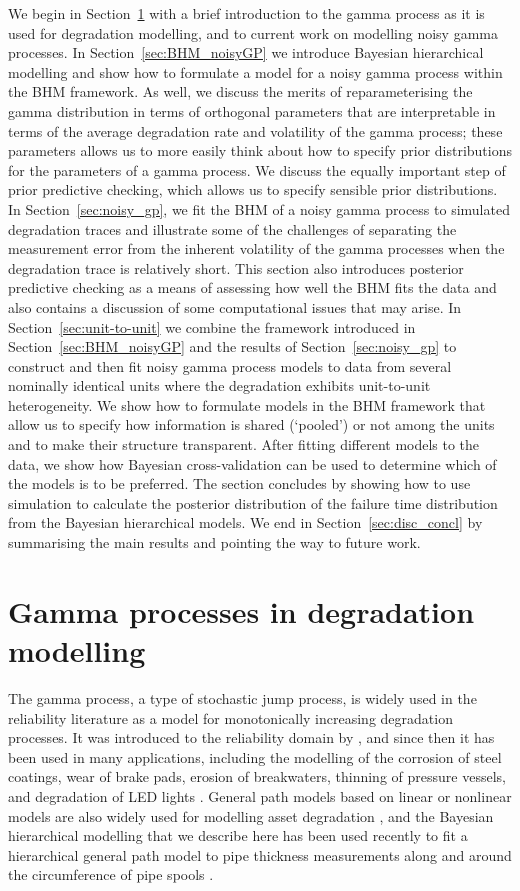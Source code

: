\documentclass{article}
\begin{document}
We begin in Section~\ref{sec:GP} with a brief introduction to the gamma process as it is used for degradation modelling, and to current work on modelling noisy gamma processes. In Section~\ref{sec:BHM_noisyGP} we introduce Bayesian hierarchical modelling and show how to formulate a model for a noisy gamma process within the BHM framework. As well, we discuss the merits of reparameterising the gamma distribution in terms of orthogonal parameters that are interpretable in terms of the average degradation rate and volatility of the gamma process; these parameters allows us to more easily think about how to specify prior distributions for the parameters of a gamma process. We  discuss the equally important step of prior predictive checking, which allows us to specify sensible prior distributions. In Section~\ref{sec:noisy_gp}, we fit the BHM of a noisy gamma process to simulated degradation traces and illustrate some of the challenges of separating the measurement error from the inherent volatility of the gamma processes when the degradation trace is relatively short. This section also introduces posterior predictive checking as a means of assessing how well the BHM fits the data and also contains a discussion of some computational issues that may arise. In Section~\ref{sec:unit-to-unit} we combine the framework introduced in Section~\ref{sec:BHM_noisyGP} and the results of Section~\ref{sec:noisy_gp} to construct and then fit noisy gamma process models to data from several nominally identical units where the degradation exhibits unit-to-unit heterogeneity. We show how to formulate models in the BHM framework that allow us to specify how information is shared (`pooled') or not among the units and to make their structure transparent. After fitting different models to the data, we show how Bayesian cross-validation can be used to determine which of the models is to be preferred. The section concludes by showing how to use simulation to calculate the posterior distribution of the failure time distribution from the Bayesian hierarchical models. We end in Section~\ref{sec:disc_concl} by summarising the main results and pointing the way to future work.

\section{Gamma processes in degradation modelling} \label{sec:GP}

The gamma process, a type of stochastic jump process, is widely used in the reliability literature as a model for monotonically increasing degradation processes. It was introduced to the reliability domain by \citet{abdel-hameed_gamma_1975}, and since then it has been used in many applications, including the modelling of the corrosion of steel coatings, wear of brake pads, erosion of breakwaters, thinning of pressure vessels, and degradation of LED lights \citep{van_noortwijk_survey_2009}. General path models based on linear or nonlinear models are also widely used for modelling asset degradation \citep{ye:2015}, and the Bayesian hierarchical modelling that we describe here has been used recently to fit a hierarchical general path model to pipe thickness measurements along and around the circumference of pipe spools \citep{Tian2019}. 
\end{document}
